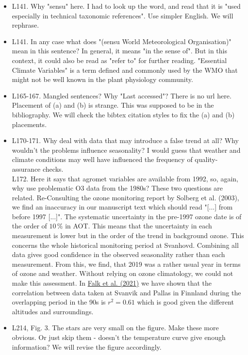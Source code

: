 \documentclass{scrartcl}
\begin{document}
\begin{itemize}
\item {\color{blue}L141. Why "sensu" here. I had to look up the word, and read that it is "used especially in technical taxonomic references". Use simpler English.}
We will rephrase.

\item {\color{blue}L141. In any case what does "(sensu World Meteorological Organisation)" mean in this sentence?}
In general, it means "in the sense of". But in this context, it could also be read as "refer to" for further reading. "Essential Climate Variables" is a term defined and commonly used by the WMO that might not be well known in the plant physiology community.

\item {\color{blue}L165-167. Mangled sentences? Why "Last accessed"? There is no url here. Placement of (a) and (b) is strange.}
This was supposed to be in the bibliography. We will check the bibtex citation styles to fix the (a) and (b) placements.

\item {\color{blue}L170-171. Why deal with data that may introduce a false trend at all? Why wouldn't the problems influence seasonality? I would guess that weather and climate conditions may well have influenced the frequency of quality-assurance checks.\\
L172. Here it says that agromet variables are available from 1992, so, again, why use problematic O3 data from the 1980s?}
These two questions are related. Re-Consulting the ozone monitoring report by Solberg et al. (2003), we find an inaccuracy in our manuscript text which should read "[...] from before 1997 [...]". The systematic uncertainty in the pre-1997 ozone date is of the order of $10\,\%$ in AOT. This means that the uncertainty in each measurement is lower but in the order of the trend in background ozone. This concerns the whole historical monitoring period at Svanhovd. Combining all data gives good confidence in the observed seasonality rather than each measurement. From this, we find, that 2019 was a rather usual year in terms of ozone and weather. Without relying on ozone climatology, we could not make this assessment. In \href{https://acp.copernicus.org/articles/21/15647/2021/}{Falk et al. (2021)} we have shown that the correlation between data taken at Svanvik and Pallas in Finnland during the overlapping period in the 90s is $r^2=0.61$ which is good given the different altitudes and surroundings.

\item {\color{blue}L214, Fig. 3. The stars are very small on the figure. Make these more obvious. Or just skip them - doesn't the temperature curve give enough information?}
We will revise the figure accordingly.


\end{itemize}
\end{document}
